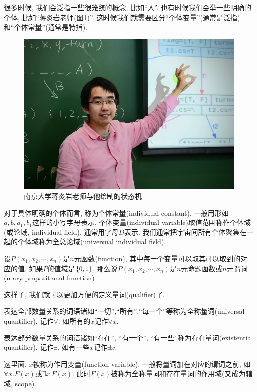 很多时候, 我们会泛指一些很笼统的概念, 比如``人''. 也有时候我们会举一些明确的个体, 比如``蒋炎岩老师(图\ref{fig:jyy})''. 这时候我们就需要区分``个体变量''(通常是泛指)和``个体常量''(通常是特指).

\begin{figure}[!htbp]
		\begin{center}
			\includegraphics[scale=0.2]{2-prop-logic/figs/jyy.jpeg}
		\end{center}
		
		\caption{南京大学蒋炎岩老师与他绘制的状态机}
		\label{fig:jyy}
	\end{figure}

\begin{definition}
	对于具体明确的个体而言, 称为个体常量(individual constant), 一般用形如$a,b,a_1,b_1$这样的小写字母表示. 个体变量(individual variable)取值范围称作个体域(或论域, individual field), 通常用字母$D$表示. 我们通常把宇宙间所有个体聚集在一起的个体域称为全总论域(universual individual field). 
\end{definition}  

\begin{definition}[$n$元命题函数]
	设$P(x_1,x_2,\cdots,x_n)$是$n$元函数(function), 其中每一个变量可以取其可以取到的对应的值. 如果$P$的值域是$\{0,1\}$, 那么说$P(x_1 ,x_2, \cdots, x_n)$是$n$元命题函数或$n$元谓词(n-ary propositional function).  
\end{definition}

这样子, 我们就可以更加方便的定义量词(qualifier)了. 

\begin{definition}[全称量词与特称量词]
	表达全部数量关系的词语诸如``一切'',``所有'',``每一个''等称为全称量词(universal quantifier), 记作$\forall$. 如所有的$x$记作$\forall x$. 
	
	表达部分数量关系的词语诸如``存在'', ``有一个'', ``有一些''称为存在量词(existential quantifier). 记作$\exists$. 如有一些$x$记作$\exists x$. 
	
	这里面, $x$被称为作用变量(function variable), 一般将量词加在对应的谓词之前, 如$\forall x. F(x)$或$\exists x. F(x)$. 此时$F(x)$被称为全称量词和存在量词的作用域(又成为辖域, scope). 
\end{definition}

